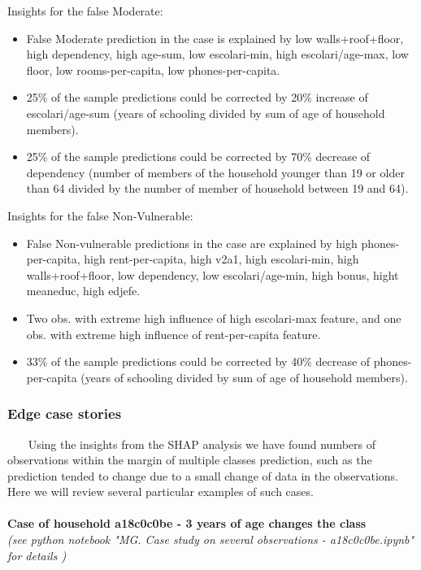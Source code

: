         Insights for the false Moderate:
        \begin{itemize}
            \item False Moderate prediction in the case is explained by low walls+roof+floor, high dependency, high age-sum, low escolari-min, high escolari/age-max, low floor, low rooms-per-capita, low phones-per-capita.
            \item 25\% of the sample predictions could be corrected by 20\% increase of escolari/age-sum (years of schooling divided by sum of age of household members). 
            \item 25\% of the sample predictions could be corrected by 70\% decrease of dependency (number of members of the household younger than 19 or older than 64 divided by the number of member of household between 19 and 64). 

        \end{itemize}
        Insights for the false Non-Vulnerable:
        \begin{itemize}
            \item False Non-vulnerable predictions in the case are explained by high phones-per-capita, high rent-per-capita, high v2a1, high escolari-min, high walls+roof+floor, low dependency, low escolari/age-min, high bonus, hight meaneduc, high edjefe.
            \item Two obs. with extreme high influence of high escolari-max feature, and one obs. with extreme high influence of rent-per-capita feature.
            \item 33\% of the sample predictions could be corrected by 40\% decrease of phones-per-capita (years of schooling divided by sum of age of household members). 
        \end{itemize}

    \subsubsection{Edge case stories}~~~
    Using the insights from the SHAP analysis we have found numbers of observations within the margin of multiple classes prediction, such as the prediction tended to change due to a small change of data in the observations. Here we will review several particular examples of such cases.\\
    \\
\textbf{Case of household a18c0c0be - 3 years of age changes the class}\\
\textit{(see python notebook "MG. Case study on several observations - a18c0c0be.ipynb" for details \cite{our_github})}\\

